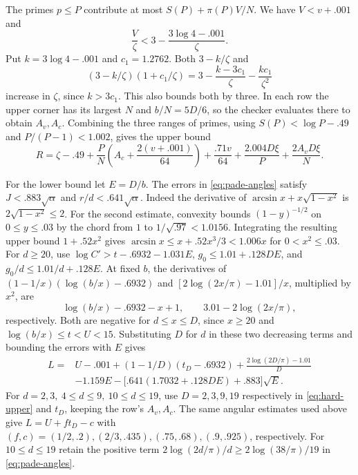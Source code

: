 The primes \(p\le P\) contribute at most
\(S(P)+\pi(P)V/N\). We have \(V<v+.001\) and
\[
 \frac{V}{\zeta}<3-\frac{3\log4-.001}{\zeta}.
\]
Put \(k=3\log4-.001\) and \(c_1=1.2762\).
Both \(3-k/\zeta\) and
\[
 (3-k/\zeta)(1+c_1/\zeta)
 =3-\frac{k-3c_1}{\zeta}-\frac{kc_1}{\zeta^2}
\]
increase in \(\zeta\), since \(k>3c_1\).
This also bounds both by three. In each row the upper corner
has its largest \(N\) and \(b/N=5D/6\), so the checker
evaluates there to obtain \(A_v,A_c\).
Combining the three ranges of primes, using \(S(P)<\log P-.49\)
and \(P/(P-1)<1.002\), gives the upper bound
\begin{equation}\label{eq:hard-upper}
 R=\zeta-.49+\frac PN\left(A_c+\frac{2(v+.001)}{64}\right)
 +\frac{.71v}{64}+\frac{2.004D\xi}{P}+\frac{2A_vD\xi}{N}.
\end{equation}

For the lower bound let \(E=D/b\).
The errors in \eqref{eq:pade-angles} satisfy
\(J<.883\sqrt\alpha\) and \(r/d<.641\sqrt\alpha\).
Indeed the derivative of \(\arcsin x+x\sqrt{1-x^2}\)
is \(2\sqrt{1-x^2}\le2\). For the second estimate,
convexity bounds \((1-y)^{-1/2}\) on \(0\le y\le.03\)
by the chord from \(1\) to \(1/\sqrt{.97}<1.0156\).
Integrating the resulting upper bound \(1+.52x^2\) gives
\(\arcsin x\le x+.52x^3/3<1.006x\) for \(0<x^2\le.03\).
For \(d\ge20\), use
\(\log C'>t-.6932-1.031E\),
\(g_0\le1.01+.128DE\), and \(g_0/d\le1.01/d+.128E\).
At fixed \(b\), the derivatives of
\((1-1/x)(\log(b/x)-.6932)\) and
\([2\log(2x/\pi)-1.01]/x\), multiplied by \(x^2\), are
\[
 \log(b/x)-.6932-x+1,\qquad 3.01-2\log(2x/\pi),
\]
respectively. Both are negative for \(d\le x\le D\), since
\(x\ge20\) and \(\log(b/x)\le t<U<15\).
Substituting \(D\) for \(d\) in these two decreasing terms
and bounding the errors with \(E\) gives
\begin{equation}\label{eq:hard-lower}
 \begin{aligned}
 L={}&U-.001+(1-1/D)(t_D-.6932)
     +\frac{2\log(2D/\pi)-1.01}{D}\\
     &-1.159E-\bigl[.641(1.7032+.128DE)+.883\bigr]\sqrt E .
 \end{aligned}
\end{equation}
For \(d=2,3,\ 4\le d\le9,\ 10\le d\le19\), use
\(D=2,3,9,19\) respectively in \eqref{eq:hard-upper} and
\(t_D\), keeping the row's \(A_v,A_c\).
The same angular estimates used above give
\(L=U+ft_D-c\) with
\((f,c)=(1/2,.2),(2/3,.435),(.75,.68),(.9,.925)\),
respectively. For \(10\le d\le19\) retain the positive term
\(2\log(2d/\pi)/d\ge2\log(38/\pi)/19\) in
\eqref{eq:pade-angles}.

